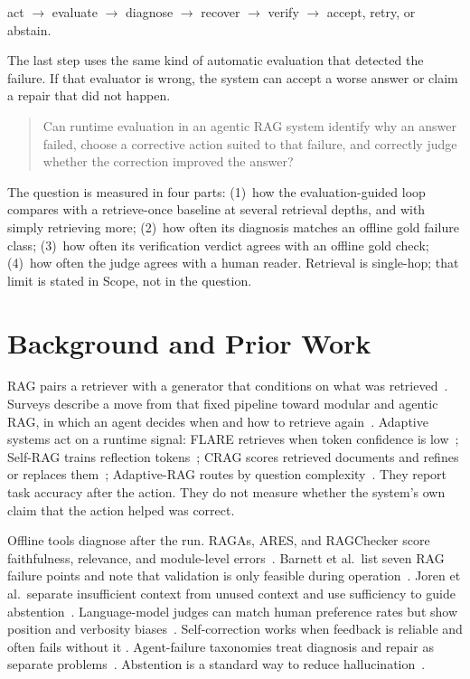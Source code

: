 \documentclass[12pt, a4paper, oneside]{report}
\begin{document}
\begin{center}
act $\rightarrow$ evaluate $\rightarrow$ diagnose $\rightarrow$ recover
$\rightarrow$ verify $\rightarrow$ accept, retry, or abstain.
\end{center}

The last step uses the same kind of automatic evaluation that detected the
failure. If that evaluator is wrong, the system can accept a worse answer
or claim a repair that did not happen.

\begin{quote}
Can runtime evaluation in an agentic RAG system identify why an answer
failed, choose a corrective action suited to that failure, and correctly
judge whether the correction improved the answer?
\end{quote}

The question is measured in four parts: (1)~how the evaluation-guided
loop compares with a retrieve-once baseline at several retrieval depths,
and with simply retrieving more; (2)~how often its diagnosis matches an
offline gold failure class; (3)~how often its verification verdict agrees
with an offline gold check; (4)~how often the judge agrees with a human
reader. Retrieval is single-hop; that limit is stated in
Scope, not in the question.

\section{Background and Prior Work}

RAG pairs a retriever with a generator that conditions on what was
retrieved~\cite{lewis2020rag}. Surveys describe a move from that fixed
pipeline toward modular and agentic RAG, in which an agent decides when
and how to retrieve again~\cite{gao2023ragsurvey,singh2025agenticrag}.
Adaptive systems act on a runtime signal: FLARE retrieves when token
confidence is low~\cite{jiang2023flare}; Self-RAG trains reflection
tokens~\cite{asai2024selfrag}; CRAG scores retrieved documents and
refines or replaces them~\cite{yan2024crag}; Adaptive-RAG routes by
question complexity~\cite{jeong2024adaptiverag}. They report task
accuracy after the action. They do not measure whether the system's own
claim that the action helped was correct.

Offline tools diagnose after the run. RAGAs, ARES, and RAGChecker score
faithfulness, relevance, and module-level
errors~\cite{es2024ragas,saadfalcon2024ares,ru2024ragchecker}. Barnett
et al.\ list seven RAG failure points and note that validation is only
feasible during operation~\cite{barnett2024sevenfailure}. Joren et al.\
separate insufficient context from unused context and use sufficiency to
guide abstention~\cite{joren2025sufficient}. Language-model judges can
match human preference rates but show position and verbosity
biases~\cite{zheng2023judging,wang2024fair}. Self-correction works when
feedback is reliable and often fails without it
\cite{huang2024cannot,kamoi2024selfcorrection,shinn2023reflexion}.
Agent-failure taxonomies treat diagnosis and repair as separate
problems~\cite{cemri2025mast,zhu2025agentdebug}. Abstention is a standard
way to reduce hallucination~\cite{wen2025abstention}.
\end{document}
